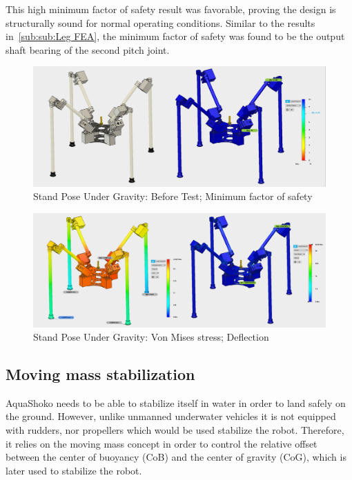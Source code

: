 This high minimum factor of safety result was favorable, proving the design is structurally sound for normal operating conditions. Similar to the results in~\ref{sub:sub:Leg FEA}, the minimum factor of safety was found to be the output shaft bearing of the second pitch joint.





 
\begin{figure}
\centering
\includegraphics[width=1.0\columnwidth]{./img/aquaShoko-v3dot3-FEA-Standing-1.png}
\caption{Stand Pose Under Gravity: Before Test; Minimum factor of safety }
\label{fig:test two pressure check}
\end{figure}

\begin{figure}[h]
\centering
\includegraphics[width=1.0\columnwidth]{./img/aquaShoko-v3dot3-FEA-Standing-2.png}
\caption{Stand Pose Under Gravity: Von Mises stress; Deflection}
\label{fig:PressureCheck2}
\end{figure}


\subsection{Moving mass stabilization}\label{sec:stable}
AquaShoko needs to be able to stabilize itself in water in order to land safely on the ground. However, unlike unmanned underwater vehicles it is not equipped with rudders, nor propellers which would be used stabilize the robot. Therefore, it relies on the moving mass concept in order to control the relative offset between the center of buoyancy (CoB) and the center of gravity (CoG), which is later used to stabilize the robot.

